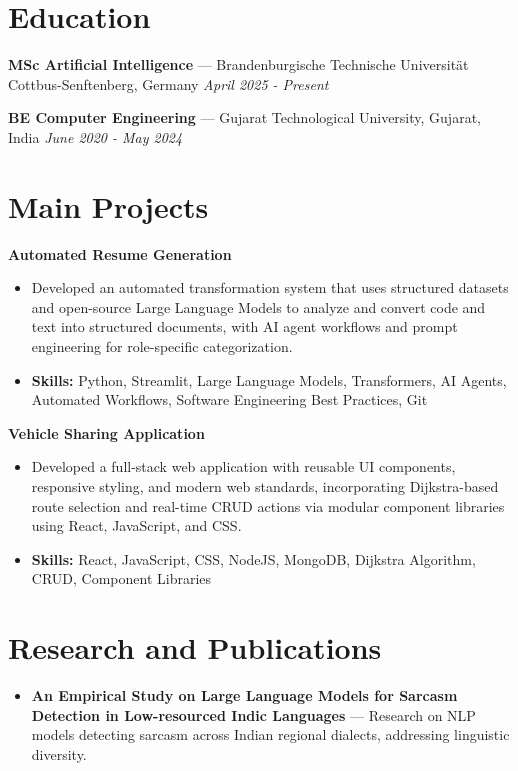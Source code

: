 \documentclass[a4paper,10pt]{article}
\begin{document}
\section*{Education}
\textbf{MSc Artificial Intelligence} — Brandenburgische Technische Universität Cottbus-Senftenberg, Germany \hfill \textit{April 2025 - Present}\par
\vspace{1.5pt}
\textbf{BE Computer Engineering} — Gujarat Technological University, Gujarat, India \hfill \textit{June 2020 - May 2024}\par

\section*{Main Projects}
\textbf{Automated Resume Generation}\par
\vspace{1pt}
\begin{itemize}
  \item Developed an automated transformation system that uses structured datasets and open-source Large Language Models to analyze and convert code and text into structured documents, with AI agent workflows and prompt engineering for role-specific categorization.
  \item \textbf{Skills:} Python, Streamlit, Large Language Models, Transformers, AI Agents, Automated Workflows, Software Engineering Best Practices, Git
\end{itemize}
\vspace{3pt}
\textbf{Vehicle Sharing Application}\par
\vspace{1pt}
\begin{itemize}
  \item Developed a full-stack web application with reusable UI components, responsive styling, and modern web standards, incorporating Dijkstra-based route selection and real-time CRUD actions via modular component libraries using React, JavaScript, and CSS.
  \item \textbf{Skills:} React, JavaScript, CSS, NodeJS, MongoDB, Dijkstra Algorithm, CRUD, Component Libraries
\end{itemize}

\section*{Research and Publications}
\begin{itemize}
\item \textbf{An Empirical Study on Large Language Models for Sarcasm Detection in Low-resourced Indic Languages} — Research on NLP models detecting sarcasm across Indian regional dialects, addressing linguistic diversity.
\end{itemize}
\end{document}
